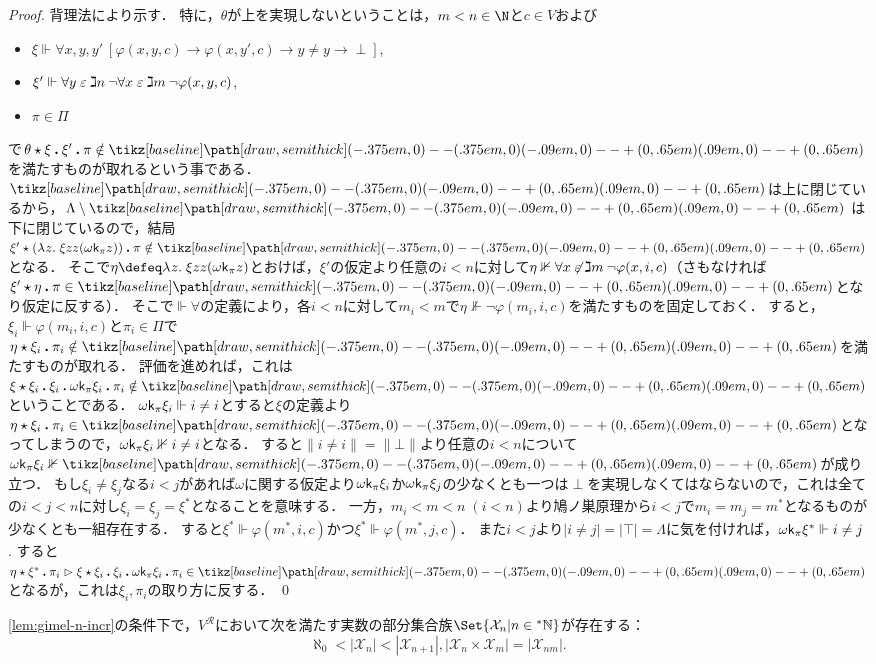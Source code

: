 \documentclass[realisability.tex]{subfiles}
\begin{document}
\begin{proof}
 背理法により示す．
 特に，$\theta$が上を実現しないということは，$m < n \in \N$と$c \in V$および
 \begin{itemize}
  \item $\xi \Vdash \forall x, y, y' \:[\varphi(x, y, c) \to \varphi(x, y', c) \to y \neq y \to \perp]$,
  \item $\xi' \Vdash \forall y \mathrel{\varepsilon} \gimel n \: \neg \forall x \mathrel{\varepsilon} \gimel m \: \neg \varphi(x, y, c)$,
  \item $\pi \in \Pi$
 \end{itemize}
 で$\KVM{\theta \xi {\xi'} \pi} \notin \pole$を満たすものが取れるという事である．
 $\pole$は上に閉じているから，$\Lambda \setminus \pole$ は下に閉じているので，結局$\KVM{{\xi'} {{(\abs{z}{\xi z z (\omega \conti_\pi z)})}} \pi } \notin \pole$となる．
 そこで$\eta \defeq \abs{z}{\xi z z (\omega \conti_\pi z)}$とおけば，$\xi'$の仮定より任意の$i < n$に対して$\eta \nVdash \forall x \not\mathrel{\varepsilon} \gimel m\:\neg \varphi(x, i, c)$（さもなければ$\xi' \cons \eta \push \pi \in \pole$となり仮定に反する）．
 そこで$\Vdash \forall$の定義により，各$i < n$に対して$m_i < m$で$\eta \nVdash  \neg \varphi(m_i, i, c)$を満たすものを固定しておく．
 すると，$\xi_i \Vdash \varphi(m_i, i, c)$と$\pi_i \in \Pi$で$\KVM{\eta {{\xi_i}} {{\pi_i}}} \notin \pole$を満たすものが取れる．
 評価を進めれば，これは$\KVM{{\xi} {{\xi_i}} {{\xi_i}} {{\omega \conti_\pi \xi_i}} {{\pi_i}}} \notin \pole$ということである．
 $\omega \mathsf{k}_\pi \xi_i \Vdash i \neq i$とすると$\xi$の定義より$\eta \cons \xi_i \push \pi_i \in \pole$となってしまうので，$\omega \mathsf{k}_\pi \xi_i \nVdash i \neq i$となる．
 すると$\|i \neq i\| = \|\bot\|$より任意の$i < n$について$\omega \conti_\pi \xi_i \nVdash \pole$が成り立つ．
 もし$\xi_i \neq \xi_j$なる$i < j$があれば$\omega$に関する仮定より$\omega \mathsf{k}_\pi \xi_i$か$\omega \mathsf{k}_\pi \xi_j$の少なくとも一つは$\perp$を実現しなくてはならないので，これは全ての$i < j < n$に対し$\xi_i = \xi_j = \xi^*$となることを意味する．
 一方，$m_i < m < n\;(i < n)$より鳩ノ巣原理から$i < j$で$m_i = m_j = m^*$となるものが少なくとも一組存在する．
 すると$\xi^* \Vdash \varphi(m^*, i, c)$かつ$\xi^* \Vdash \varphi(m^*, j, c)$．
 また$i < j$より$|i \neq j| = |\top| = \Lambda$に気を付ければ，$\omega \mathsf{k}_\pi \xi^* \Vdash i \neq j$.
 すると$\KVM{\eta {{\xi^*}} {{\pi_i}}} \reds \KVM{\xi {{\xi_i}} {{\xi_i}} {{\omega \conti_\pi \xi_i}}{{\pi_i}}} \in \pole$となるが，これは$\xi_i, \pi_i$の取り方に反する． \qed
\end{proof}

\begin{corollary}
 \cref{lem:gimel-n-incr}の条件下で，$V^{\mathcal{R}}$において次を満たす実数の部分集合族$\Set{\mathcal{X}_n | n \in \NN}$が存在する：
 \[
  \aleph_0 < |\mathcal{X}_n| < |\mathcal{X}_{n+1}|, |\mathcal{X}_n \times \mathcal{X}_m| = |\mathcal{X}_{n m}|.
 \]
\end{corollary}
\end{document}
